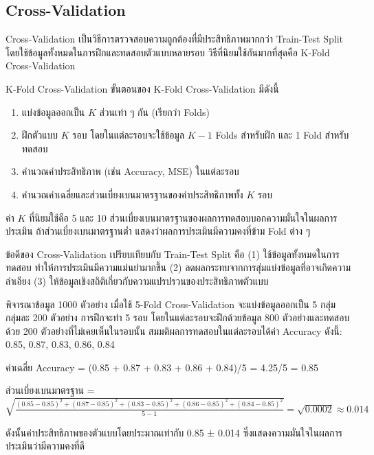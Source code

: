 \subsection{Cross-Validation}
Cross-Validation เป็นวิธีการตรวจสอบความถูกต้องที่มีประสิทธิภาพมากกว่า Train-Test Split โดยใช้ข้อมูลทั้งหมดในการฝึกและทดสอบตัวแบบหลายรอบ วิธีที่นิยมใช้กันมากที่สุดคือ K-Fold Cross-Validation

\begin{myBox}[]{K-Fold Cross-Validation}{}
ขั้นตอนของ K-Fold Cross-Validation มีดังนี้

\begin{enumerate}
\item แบ่งข้อมูลออกเป็น $K$ ส่วนเท่า ๆ กัน (เรียกว่า Folds)
\item ฝึกตัวแบบ $K$ รอบ โดยในแต่ละรอบจะใช้ข้อมูล $K-1$ Folds สำหรับฝึก และ 1 Fold สำหรับทดสอบ
\item คำนวณค่าประสิทธิภาพ (เช่น Accuracy, MSE) ในแต่ละรอบ
\item คำนวณค่าเฉลี่ยและส่วนเบี่ยงเบนมาตรฐานของค่าประสิทธิภาพทั้ง $K$ รอบ
\end{enumerate}

ค่า $K$ ที่นิยมใช้คือ 5 และ 10 ส่วนเบี่ยงเบนมาตรฐานของผลการทดสอบบอกความมั่นใจในผลการประเมิน ถ้าส่วนเบี่ยงเบนมาตรฐานต่ำ แสดงว่าผลการประเมินมีความคงที่ข้าม Fold ต่าง ๆ
\end{myBox}

ข้อดีของ Cross-Validation เปรียบเทียบกับ Train-Test Split คือ (1) ใช้ข้อมูลทั้งหมดในการทดสอบ ทำให้การประเมินมีความแม่นยำมากขึ้น (2) ลดผลกระทบจากการสุ่มแบ่งข้อมูลที่อาจเกิดความลำเอียง (3) ให้ข้อมูลเชิงสถิติเกี่ยวกับความแปรปรวนของประสิทธิภาพตัวแบบ

\begin{exmp}
พิจารณาข้อมูล 1000 ตัวอย่าง เมื่อใช้ 5-Fold Cross-Validation จะแบ่งข้อมูลออกเป็น 5 กลุ่ม กลุ่มละ 200 ตัวอย่าง การฝึกจะทำ 5 รอบ โดยในแต่ละรอบจะฝึกด้วยข้อมูล 800 ตัวอย่างและทดสอบด้วย 200 ตัวอย่างที่ไม่เคยเห็นในรอบนั้น สมมติผลการทดสอบในแต่ละรอบได้ค่า Accuracy ดังนี้: 0.85, 0.87, 0.83, 0.86, 0.84

ค่าเฉลี่ย Accuracy = (0.85 + 0.87 + 0.83 + 0.86 + 0.84)/5 = 4.25/5 = 0.85

ส่วนเบี่ยงเบนมาตรฐาน = $\sqrt{\frac{(0.85-0.85)^2+(0.87-0.85)^2+(0.83-0.85)^2+(0.86-0.85)^2+(0.84-0.85)^2}{5-1}} = \sqrt{0.0002} \approx 0.014$

ดังนั้นค่าประสิทธิภาพของตัวแบบโดยประมาณเท่ากับ 0.85 ± 0.014 ซึ่งแสดงความมั่นใจในผลการประเมินว่ามีความคงที่ดี
\end{exmp}

